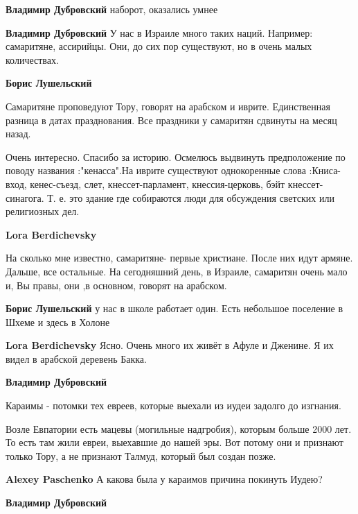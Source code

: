 \begin{itemize}
\begin{itemize} %
\textbf{Владимир Дубровский} наборот, оказались умнее

\textbf{Владимир Дубровский}
У нас в Израиле много таких наций. Например: самаритяне, ассирийцы. Они, до сих пор существуют, но в очень малых количествах.

\begin{itemize} %
\textbf{Борис Лушельский} 

Самаритяне проповедуют Тору, говорят на арабском и иврите. Единственная разница в
датах празднования. Все праздники у самаритян сдвинуты на месяц назад.


Очень интересно. Спасибо за историю. Осмелюсь выдвинуть предположение по поводу
названия :"кенасса".На иврите существуют однокоренные слова
:Книса-вход, кенес-съезд, слет, кнессет-парламент, кнессия-церковь, бэйт
кнессет-синагога. Т. е. это здание где собираются люди для обсуждения светских
или религиозных дел.


\textbf{Lora Berdichevsky}

На сколько мне известно, самаритяне- первые христиане. После них идут армяне.
Дальше, все остальные. На сегодняшний день, в Израиле, самаритян очень мало и, Вы
правы, они ,в основном, говорят на арабском.

\textbf{Борис Лушельский} у нас в школе работает один. Есть небольшое поселение в Шхеме и здесь в Холоне

\textbf{Lora Berdichevsky}
Ясно. Очень много их живёт в Афуле и Дженине. Я их видел в арабской деревень Бакка.
\end{itemize} %

\textbf{Владимир Дубровский} 

Караимы - потомки тех евреев, которые выехали из иудеи задолго до изгнания.

Возле Евпатории есть мацевы (могильные надгробия), которым больше 2000 лет. То
есть там жили евреи, выехавшие до нашей эры. Вот потому они и признают только
Тору, а не признают Талмуд, который был создан позже.

\textbf{Alexey Paschenko} А какова была у караимов причина покинуть Иудею?

\textbf{Владимир Дубровский} 


\end{itemize}
\end{itemize}

